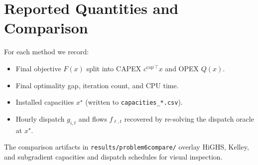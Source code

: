\documentclass[11pt]{article}
\begin{document}
\section{Reported Quantities and Comparison}
For each method we record:
\begin{itemize}
    \item Final objective $F(x)$ split into CAPEX
          $c^{\text{cap}\,\top} x$ and OPEX $Q(x)$.
    \item Final optimality gap, iteration count, and CPU time.
    \item Installed capacities $x^\star$ (written to
          \texttt{capacities\_*.csv}).
    \item Hourly dispatch $g_{i,t}$ and flows $f_{\ell,t}$ recovered by
          re-solving the dispatch oracle at $x^\star$.
\end{itemize}
The comparison artifacts in
\texttt{results/problem6compare/} overlay HiGHS, Kelley, and
subgradient capacities and dispatch schedules for visual inspection.
\end{document}
